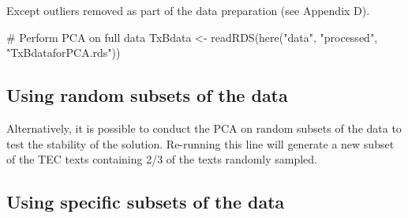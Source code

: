\documentclass[
  letterpaper,
  DIV=11,
  numbers=noendperiod]{scrreprt}
\newenvironment{Shaded}{\begin{snugshade}}{\end{snugshade}}
\newcommand{\AttributeTok}[1]{\textcolor[rgb]{0.40,0.45,0.13}{#1}}
\newcommand{\CommentTok}[1]{\textcolor[rgb]{0.37,0.37,0.37}{#1}}
\newcommand{\ConstantTok}[1]{\textcolor[rgb]{0.56,0.35,0.01}{#1}}
\newcommand{\DecValTok}[1]{\textcolor[rgb]{0.68,0.00,0.00}{#1}}
\newcommand{\FloatTok}[1]{\textcolor[rgb]{0.68,0.00,0.00}{#1}}
\newcommand{\FunctionTok}[1]{\textcolor[rgb]{0.28,0.35,0.67}{#1}}
\newcommand{\NormalTok}[1]{\textcolor[rgb]{0.00,0.23,0.31}{#1}}
\newcommand{\OtherTok}[1]{\textcolor[rgb]{0.00,0.23,0.31}{#1}}
\newcommand{\SpecialCharTok}[1]{\textcolor[rgb]{0.37,0.37,0.37}{#1}}
\newcommand{\StringTok}[1]{\textcolor[rgb]{0.13,0.47,0.30}{#1}}
\begin{document}
Except outliers removed as part of the data preparation (see Appendix
D).

\begin{Shaded}
\begin{Highlighting}[]
\CommentTok{\# Perform PCA on full data}
\NormalTok{TxBdata }\OtherTok{\textless{}{-}} \FunctionTok{readRDS}\NormalTok{(}\FunctionTok{here}\NormalTok{(}\StringTok{"data"}\NormalTok{, }\StringTok{"processed"}\NormalTok{, }\StringTok{"TxBdataforPCA.rds"}\NormalTok{))}
\end{Highlighting}
\end{Shaded}

\subsection{Using random subsets of the
data}\label{using-random-subsets-of-the-data}

Alternatively, it is possible to conduct the PCA on random subsets of
the data to test the stability of the solution. Re-running this line
will generate a new subset of the TEC texts containing 2/3 of the texts
randomly sampled.

\begin{Shaded}
\end{Shaded}

\subsection{Using specific subsets of the
data}\label{using-specific-subsets-of-the-data}
\end{document}
